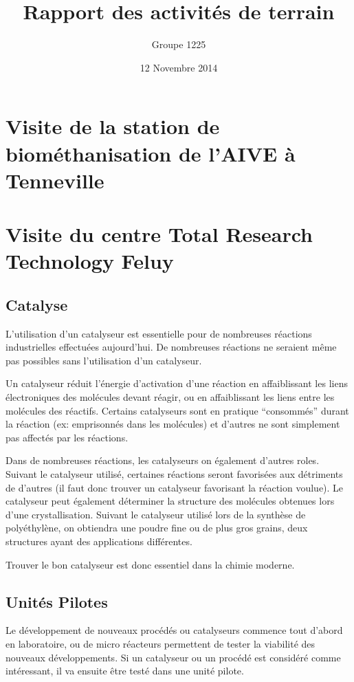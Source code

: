 \documentclass[a4paper, oneside, 12pt]{article}
\title{Rapport des activités de terrain}
\author{Groupe 1225}
\date{12 Novembre 2014}
\begin{document}
\maketitle

\section{Visite de la station de biométhanisation de l’AIVE
à Tenneville}

\section{Visite du centre Total Research Technology Feluy}

\subsection{Catalyse}
 
L'utilisation d'un catalyseur est essentielle pour de nombreuses réactions industrielles effectuées aujourd'hui. De nombreuses réactions ne seraient même pas possibles sans l'utilisation d'un catalyseur.
 
Un catalyseur réduit l'énergie d'activation d'une réaction en affaiblissant les liens électroniques des molécules devant réagir, ou en affaiblissant les liens entre les molécules des réactifs. Certains catalyseurs sont en pratique ``consommés'' durant la réaction (ex: emprisonnés dans les molécules) et d'autres ne sont simplement pas affectés par les réactions. 

Dans de nombreuses réactions, les catalyseurs on également d'autres roles. Suivant le catalyseur utilisé, certaines réactions seront favorisées aux détriments de d'autres (il faut donc trouver un catalyseur favorisant la réaction voulue). Le catalyseur peut également déterminer la structure des molécules obtenues lors d'une crystallisation. Suivant le catalyseur utilisé lors de la synthèse de polyéthylène, on obtiendra une poudre fine ou de plus gros grains, deux structures ayant des applications différentes.
 
Trouver le bon catalyseur est donc essentiel dans la chimie moderne.
 
\subsection{Unités Pilotes}
 
Le développement de nouveaux procédés ou catalyseurs commence tout d'abord en laboratoire, ou de micro réacteurs permettent de tester la viabilité des nouveaux développements. Si un catalyseur ou un procédé est considéré comme intéressant, il va ensuite être testé dans une unité pilote. 
\end{document}

